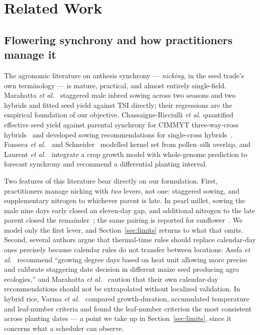 \documentclass[10pt,twocolumn]{article}
\begin{document}
\section{Related Work}

\subsection{Flowering synchrony and how practitioners manage it}

The agronomic literature on anthesis synchrony --- \emph{nicking}, in the
seed trade's own terminology --- is mature, practical, and almost entirely
single-field. Marahatta \textit{et al.}~\cite{marahatta2025} staggered male
inbred sowing across two seasons and two hybrids and fitted seed yield
against TSI directly; their regressions are the empirical foundation of our
objective. Chassaigne-Ricciulli \textit{et al.} quantified effective seed
yield against parental synchrony for CIMMYT three-way-cross
hybrids~\cite{chassaigne2021} and developed sowing recommendations for
single-cross hybrids~\cite{chassaigne2020}. Fonseca \textit{et
al.}~\cite{fonseca2004} and Schneider~\cite{schneider2005} modelled kernel
set from pollen--silk overlap, and Laurent \textit{et al.}~\cite{laurent2025}
integrate a crop growth model with whole-genome prediction to forecast
synchrony and recommend a differential planting interval.

Two features of this literature bear directly on our formulation. First,
practitioners manage nicking with \emph{two} levers, not one: staggered
sowing, and supplementary nitrogen to whichever parent is late. In pearl
millet, sowing the male nine days early closed an eleven-day gap, and
additional nitrogen to the late parent closed the
remainder~\cite{priyanka2017}; the same pairing is reported for
sunflower~\cite{patil2026}. We model only the first lever, and
Section~\ref{sec:limits} returns to what that omits. Second, several authors
argue that thermal-time rules should replace calendar-day ones precisely
because calendar rules do not transfer between locations: Asefa \textit{et
al.}~\cite{asefa2024} recommend ``growing degree days based on heat unit
allowing more precise and calibrate staggering date decision in different
maize seed producing agro ecologies,'' and Marahatta \textit{et
al.}~\cite{marahatta2025} caution that their own calendar-day recommendations
should not be extrapolated without localized validation. In hybrid rice,
Varma \textit{et al.}~\cite{varma2018} compared growth-duration, accumulated
temperature and leaf-number criteria and found the leaf-number criterion the
most consistent across planting dates --- a point we take up in
Section~\ref{sec:limits}, since it concerns what a scheduler can observe.
\end{document}
